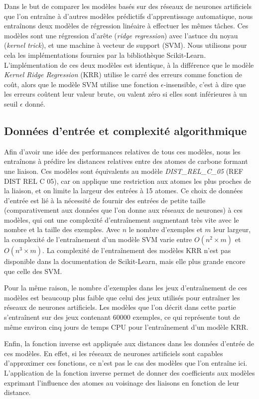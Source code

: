 \par Dans le but de comparer les modèles basés sur des réseaux de neurones artificiels que l'on entraîne à d'autres modèles prédictifs d'apprentissage automatique, nous entraînons deux modèles de régression linéaire à effectuer les mêmes tâches. Ces modèles sont une régression d'arête (\emph{ridge regression}) avec l'astuce du noyau (\emph{kernel trick}), et une machine à vecteur de support (SVM). Nous utilisons pour cela les implémentations fournies par la bibliothèque Scikit-Learn\cite{sklearn}. L'implémentation de ces deux modèles est identique, à la différence que le modèle \emph{Kernel Ridge Regression} (KRR) utilise le carré des erreurs comme fonction de coût, alors que le modèle SVM utilise une fonction $\epsilon$-insensible, c'est à dire que les erreurs coûtent leur valeur brute, ou valent zéro si elles sont inférieures à un seuil $\epsilon$ donné.
\\

\subsection{Données d'entrée et complexité algorithmique}

\par Afin d'avoir une idée des performances relatives de tous ces modèles, nous les entraînons à prédire les distances relatives entre des atomes de carbone formant une liaison. Ces modèles sont équivalents au modèle \emph{DIST\_REL\_C\_05} (REF DIST REL C 05), car on applique une restriction aux atomes les plus proches de la liaison, et on limite la largeur des entrées à 15 atomes. Ce choix de données d'entrée est lié à la nécessité de fournir des entrées de petite taille (comparativement aux données que l'on donne aux réseaux de neurones) à ces modèles, qui ont une complexité d'entraînement augmentant très vite avec le nombre et la taille des exemples. Avec $n$ le nombre d'exemples et $m$ leur largeur, la complexité de l'entraînement d'un modèle SVM varie entre $O(n^2\times m)$ et $O(n^3\times m)$. La complexité de l'entraînement des modèles KRR n'est pas disponible dans la documentation de Scikit-Learn, mais elle plus grande encore que celle des SVM.
\par Pour la même raison, le nombre d'exemples dans les jeux d'entraînement de ces modèles est beaucoup plus faible que celui des jeux utilisés pour entraîner les réseaux de neurones artificiels. Les modèles que l'on décrit dans cette partie s'entraînent sur des jeux contenant 60000 exemples, ce qui représente tout de même environ cinq jours de temps CPU pour l'entraînement d'un modèle KRR.
\par Enfin, la fonction inverse est appliquée aux distances dans les données d'entrée de ces modèles. En effet, si les réseaux de neurones artificiels sont capables d'approximer ces fonctions, ce n'est pas le cas des modèles que l'on entraîne ici. L'application de la fonction inverse permet de donner des coefficients aux modèles exprimant l'influence des atomes au voisinage des liaisons en fonction de leur distance.

